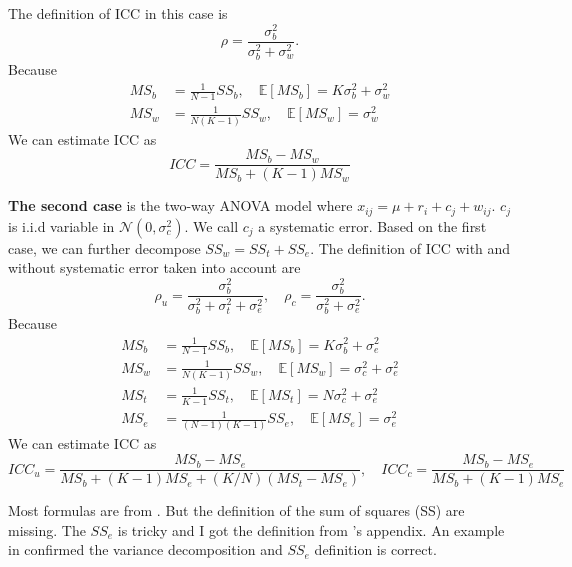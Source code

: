 \documentclass[12pt]{article}
\begin{document}
The definition of ICC in this case is \[ \rho = \frac{\sigma_b^2}{\sigma_b^2 + \sigma_w^2}.\] Because
\begin{align*}
  MS_b &= \frac{1}{N-1}SS_b, \quad \mathbb{E}[MS_b] = K\sigma_b^2 + \sigma_w^2\\
  MS_w &= \frac{1}{N(K-1)}SS_w, \quad \mathbb{E}[MS_w] = \sigma_w^2
\end{align*}
We can estimate ICC as
\[
ICC = \frac{MS_b - MS_w}{MS_b + (K-1) MS_w}
\]

\textbf{The second case} is the two-way ANOVA model where $x_{ij} = \mu + r_i + c_j +
w_{ij}$. $c_j$ is i.i.d variable in $\mathcal{N}(0, \sigma_c^2)$. We call $c_j$
a systematic error. Based on the first case, we can further decompose $SS_w =
SS_t + SS_e$. The definition of ICC with and without systematic error taken into account are\[\rho_u = \frac{\sigma_b^2}{\sigma_b^2 + \sigma_t^2 + \sigma_e^2}, \quad \rho_c = \frac{\sigma_b^2}{\sigma_b^2 + \sigma_e^2}.\] Because
\begin{align*}
    MS_b &= \frac{1}{N-1}SS_b, \quad \mathbb{E}[MS_b] = K\sigma_b^2 + \sigma_e^2\\
    MS_w &= \frac{1}{N(K-1)}SS_w, \quad \mathbb{E}[MS_w] = \sigma_c^2 + \sigma_e^2 \\
    MS_t &= \frac{1}{K-1} SS_t, \quad \mathbb{E}[MS_t] = N \sigma_c^2 + \sigma_e^2 \\
    MS_e &= \frac{1}{(N-1)(K-1)}SS_e, \quad \mathbb{E}[MS_e] = \sigma_e^2
\end{align*}
We can estimate ICC as \[ICC_u = \frac{MS_b - MS_e}{MS_b + (K-1)MS_e + (K/N)(MS_t - MS_e)}, \quad ICC_c = \frac{MS_b - MS_e}{MS_b + (K-1)MS_e}\]

Most formulas are from \cite{mcgraw1996forming}. But the definition of the sum of squares (SS) are missing. The $SS_e$ is tricky and I got the definition from \cite{zuo2010reliable}'s appendix. An example in \cite{shrout1979intraclass} confirmed the variance decomposition and $SS_e$ definition is correct.



\end{document}
